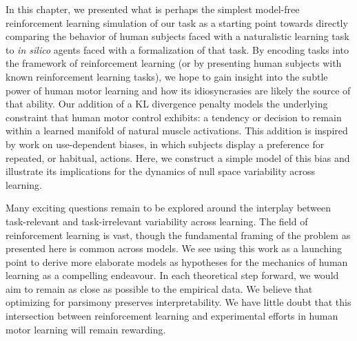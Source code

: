 \documentclass[../main.tex]{subfiles}
\begin{document}
In this chapter, we presented what is perhaps the simplest model-free reinforcement learning simulation of our task as a starting point towards directly comparing the behavior of human subjects faced with a naturalistic learning task to \textit{in silico} agents faced with a formalization of that task. By encoding tasks into the framework of reinforcement learning (or by presenting human subjects with known reinforcement learning tasks), we hope to gain insight into the subtle power of human motor learning and how its idiosyncrasies are likely the source of that ability. Our addition of a KL divergence penalty models the underlying constraint that human motor control exhibits: a tendency or decision to remain within a learned manifold of natural muscle activations. This addition is inspired by work on use-dependent biases, in which subjects display a preference for repeated, or habitual, actions\cite{dengUsedependentBiasesOptimal2024,tsayDissociableUsedependentProcesses2022}. Here, we construct a simple model of this bias and illustrate its implications for the dynamics of null space variability across learning.

Many exciting questions remain to be explored around the interplay between task-relevant and task-irrelevant variability across learning. The field of reinforcement learning is vast, though the fundamental framing of the problem as presented here is common across models. We see using this work as a launching point to derive more elaborate models as hypotheses for the mechanics of human learning as a compelling endeavour. In each theoretical step forward, we would aim to remain as close as possible to the empirical data. We believe that optimizing for parsimony preserves interpretability. We have little doubt that this intersection between reinforcement learning and experimental efforts in human motor learning will remain rewarding.


\ifSubfilesClassLoaded{%
    \newpage%
}{}%
\end{document}
